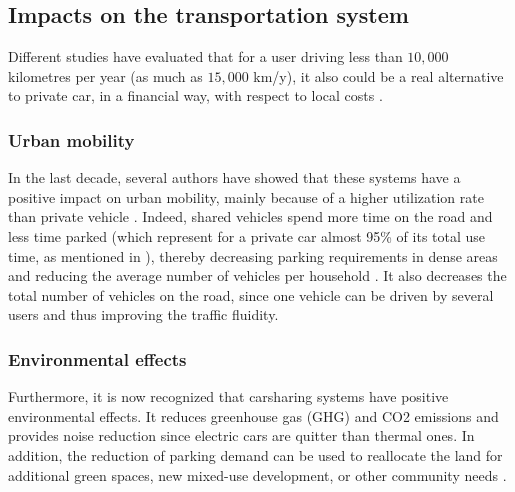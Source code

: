 \begin{bibunit}[ieeetr]
\subsection{Impacts on the transportation system}

Different studies have evaluated that for a user driving less than $10,000$ kilometres per year (as much as $15,000$ km/y), it also could be a real alternative to private car, in a financial way, with respect to local costs \cite{litman_evaluating_2000, prettenthaler_ownership_1999}.

\subsubsection{Urban mobility}

In the last decade, several authors have showed that these systems have a positive impact on urban mobility, mainly because of a higher utilization rate than private vehicle \cite{litman_evaluating_2000, schuster_assessing_2005}.
Indeed, shared vehicles spend more time on the road and less time parked (which represent for a private car almost 95\% of its total use time, as mentioned in \cite{transflash_2013}), thereby decreasing parking requirements in dense areas \cite{mitchell_reinventing_2010} and reducing the average number of vehicles per household \cite{martin_impact_2010, ter_schure_cumulative_2012}.
It also decreases the total number of vehicles on the road, since one vehicle can be driven by several users and thus improving the traffic fluidity.

\subsubsection{Environmental effects}
Furthermore, it is now recognized that carsharing systems have positive environmental effects.
It reduces greenhouse gas (GHG) and CO2 emissions \cite{martin_greenhouse_2011, firnkorn_what_2011} and provides noise reduction since electric cars are quitter than thermal ones.
In addition, the reduction of parking demand can be used to reallocate the land for additional green spaces, new mixed-use development, or other community needs \cite{cohen_carsharing_2008}.





\end{bibunit}
